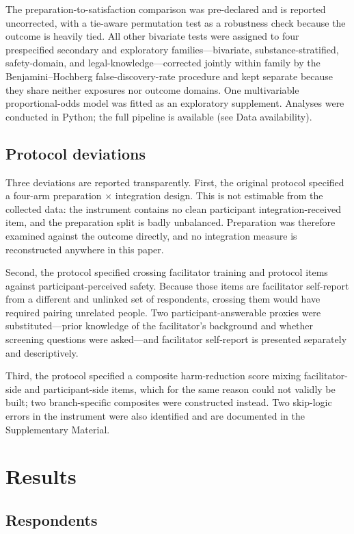 \documentclass[12pt]{article}
\begin{document}
The preparation-to-satisfaction comparison was pre-declared and is reported uncorrected, with a tie-aware
permutation test as a robustness check because the outcome is heavily tied. All other bivariate tests were
assigned to four prespecified secondary and exploratory families---bivariate, substance-stratified,
safety-domain, and legal-knowledge---corrected jointly within family by the Benjamini--Hochberg
false-discovery-rate procedure and kept separate because they share neither exposures nor outcome domains.
One multivariable proportional-odds model was fitted as an exploratory supplement. Analyses were conducted
in Python; the full pipeline is available (see Data availability).

\subsection{Protocol deviations}

Three deviations are reported transparently. First, the original protocol specified a four-arm preparation
$\times$ integration design. This is not estimable from the collected data: the instrument contains no
clean participant integration-received item, and the preparation split is badly unbalanced. Preparation was
therefore examined against the outcome directly, and no integration measure is reconstructed anywhere in
this paper.

Second, the protocol specified crossing facilitator training and protocol items against participant-perceived
safety. Because those items are facilitator self-report from a different and unlinked set of respondents,
crossing them would have required pairing unrelated people. Two participant-answerable proxies were
substituted---prior knowledge of the facilitator's background and whether screening questions were
asked---and facilitator self-report is presented separately and descriptively.

Third, the protocol specified a composite harm-reduction score mixing facilitator-side and participant-side
items, which for the same reason could not validly be built; two branch-specific composites were
constructed instead. Two skip-logic errors in the instrument were also identified and are documented in the
Supplementary Material.

\section{Results}

\subsection{Respondents}
\end{document}
